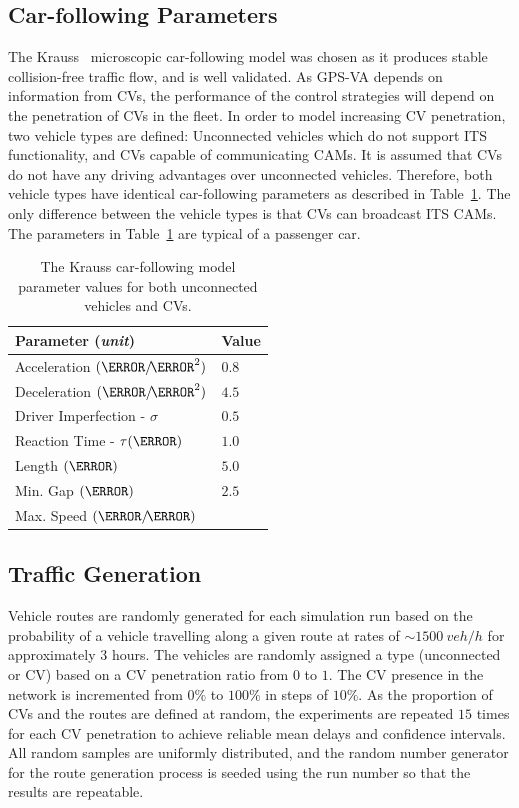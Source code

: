 \documentclass[numbered]{trbunofficial}
\newcommand{\sidiv}{/\hspace{-1.5pt}} %
\begin{document}
\subsection{Car-following Parameters}
The Krauss~\cite{Krauss1998} microscopic car-following model was chosen as it produces stable collision-free traffic flow, and is well validated. As GPS-VA depends on information from CVs, the performance of the control strategies will depend on the penetration of CVs in the fleet. In order to model increasing CV penetration, two vehicle types are defined: Unconnected vehicles which do not support ITS functionality, and CVs capable of communicating CAMs. It is assumed that CVs do not have any driving advantages over unconnected vehicles. Therefore, both vehicle types have identical car-following parameters as described in Table~\ref{tab:vtype}. The only difference between the vehicle types is that CVs can broadcast ITS CAMs. The parameters in Table~\ref{tab:vtype} are typical of a passenger car.

\begin{table}[htb!]
	\small
	\centering
	\caption{The Krauss car-following model parameter values for both unconnected vehicles and CVs.\vspace{-1.ex}}
	\begin{tabular}{p{} >{\centering\arraybackslash}p{}}
		\toprule
		\textbf{Parameter (\emph{unit})} & \textbf{Value} \\\toprule
		Acceleration $(\m\sidiv\s^2)$ & $0.8$ \\ \midrule
		Deceleration $(\m\sidiv\s^2)$ & $4.5$ \\ \midrule
		Driver Imperfection - $\sigma$ & $0.5$ \\ \midrule
		Reaction Time - $\tau(\s)$ & $1.0$ \\ \midrule
		Length $(\m)$ & $5.0$ \\ \midrule
		Min. Gap $(\m)$ & $2.5$ \\ \midrule
		Max. Speed $(\m\sidiv\s)$ & 25 \\ 
		\bottomrule
	\end{tabular}
	\label{tab:vtype}
\end{table}

\subsection{Traffic Generation}
Vehicle routes are randomly generated for each simulation run based on the probability of a vehicle travelling along a given route at rates of $\sim\!\!1500\ veh/h$ for approximately $3$ hours. The vehicles are randomly assigned a type (unconnected or CV) based on a CV penetration ratio from $0$ to $1$. The CV presence in the network is incremented from $0\%$ to $100\%$ in steps of $10\%$. As the proportion of CVs and the routes are defined at random, the experiments are repeated $15$ times for each CV penetration to achieve reliable mean delays and confidence intervals. All random samples are uniformly distributed, and the random number generator for the route generation process is seeded using the run number so that the results are repeatable.
\end{document}
